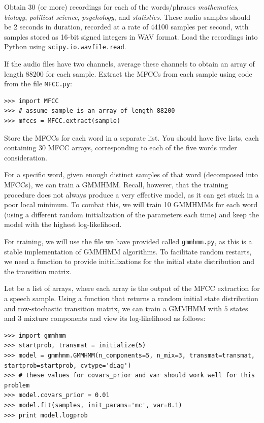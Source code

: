 \begin{problem}
Obtain $30$ (or more) recordings for each of the words/phrases \emph{mathematics}, \emph{biology}, \emph{political science}, \emph{psychology}, and \emph{statistics}.
These audio samples should be 2 seconds in duration, recorded at a rate of 44100 samples per second, with samples stored as 16-bit signed integers in WAV format.
Load the recordings into Python using {\tt scipy.io.wavfile.read}.

If the audio files have two channels, average these channels to obtain an array of length $88200$ for each sample.
Extract the MFCCs from each sample using code from the file {\tt MFCC.py}:
\begin{lstlisting}
>>> import MFCC
>>> # assume sample is an array of length 88200
>>> mfccs = MFCC.extract(sample)
\end{lstlisting}
Store the MFCCs for each word in a separate list. You should have five lists, each containing 30 MFCC arrays, corresponding to each of the five words
under consideration.
\end{problem}

For a specific word, given enough distinct samples of that word (decomposed into MFCCs), we can train a GMMHMM.
Recall, however, that the training procedure does not always produce a very effective model, as it can get stuck in a poor local minimum. 
To combat this, we will train 10 GMMHMMs for each word (using a different random initialization of the parameters each time)
and keep the model with the highest log-likelihood.

For training, we will use the file we have provided called {\tt gmmhmm.py}, as this is a stable implementation of GMMHMM algorithms.
To facilitate random restarts, we need a function to provide initializations for the initial state distribution and the transition matrix.

Let  be a list of arrays, where each array is the output of the MFCC extraction for a speech sample.
Using a function  that returns a random initial state distribution and row-stochastic transition matrix, we can train a GMMHMM with $5$ states
and $3$ mixture components and view its log-likelihood as follows:
\begin{lstlisting}
>>> import gmmhmm
>>> startprob, transmat = initialize(5)
>>> model = gmmhmm.GMMHMM(n_components=5, n_mix=3, transmat=transmat, startprob=startprob, cvtype='diag')
>>> # these values for covars_prior and var should work well for this problem
>>> model.covars_prior = 0.01
>>> model.fit(samples, init_params='mc', var=0.1)
>>> print model.logprob
\end{lstlisting}

